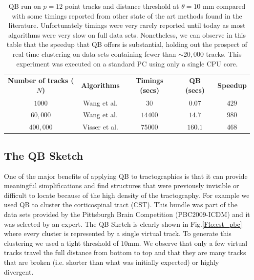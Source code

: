 \documentclass[preprint,authoryear,a4paper,10pt,onecolumn]{elsarticle}
\begin{document}
%
\begin{table}
\small\addtolength{\tabcolsep}{-5pt}

\begin{centering}
\begin{tabular}{|c|c|c|c|c|}
\hline 
Number of tracks ($N$) & Algorithms & Timings (secs) & QB (secs) & Speedup\tabularnewline
\hline
\hline 
$1000$ & Wang et al. \cite{wang2010tractography} & $30$ & $0.07$ & $429$\tabularnewline
\hline 
$60,000$ & Wang et al. \cite{wang2010tractography} & $14400$ & $14.7$ & $980$\tabularnewline
\hline 
$400,000$ & Visser et al. \cite{Visser2010} & $75000$ & $160.1$ & $468$\tabularnewline
\hline
\end{tabular}
\par\end{centering}
\caption{QB run on $p=12$ point tracks and distance threshold at $\theta=10$ mm
compared with some timings reported from other state of the art methods
found in the literature. Unfortunately timings were very rarely reported
until today as most algorithms were very slow on full data sets. Nonetheless,
we can observe in this table that the speedup that QB offers is substantial,
holding out the prospect of real-time clustering on data sets containing
fewer than $\sim 20,000$ tracks. This experiment was executed on a
standard PC using only a single CPU core.\label{Flo:timings}}
\end{table}

\subsection{The QB Sketch}

One of the major benefits of applying QB to tractographies is that it
can provide meaningful simplifications and find structures that were
previously invisible or difficult to locate because of the high density
of the tractography. For example we used QB to cluster the corticospinal
tract (CST). This bundle was part of the data sets provided by the
Pittsburgh Brain Competition (PBC2009-ICDM) and it was selected by an
expert. The QB Sketch is clearly shown in Fig.\ref{Flo:cst_pbc} where
every cluster is represented by a single virtual track. To generate this
clustering we used a tight threshold of $10$mm. We observe that only a
few virtual tracks travel the full distance from bottom to top and that
they are many tracks that are broken (i.e. shorter than what was
initially expected) or highly divergent.
\end{document}
